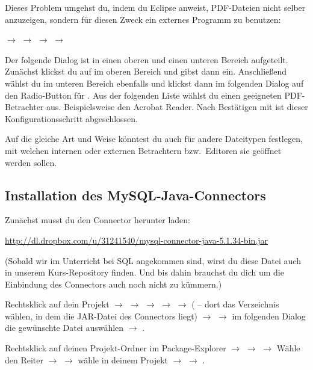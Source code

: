 Dieses Problem umgehst du, indem du Eclipse anweist, PDF-Dateien nicht selber
anzuzeigen, sondern für diesen Zweck ein externes Programm zu benutzen:

 $\rightarrow$  $\rightarrow$ 
$\rightarrow$  $\rightarrow$ 

Der folgende Dialog ist in einen oberen und einen unteren Bereich aufgeteilt.
Zunächst klickst du auf  im oberen Bereich und gibst dann
 ein. Anschließend wählst du im unteren Bereich ebenfalls
 und klickst dann im folgenden Dialog auf den Radio-Button für
. Aus der folgenden Liste wählst du einen geeigneten
PDF-Betrachter aus. Beispielsweise den Acrobat Reader. Nach Bestätigen mit
 ist dieser Konfigurationsschritt abgeschlossen.

Auf die gleiche Art und Weise könntest du auch für andere Dateitypen festlegen,
mit welchen internen oder externen Betrachtern bzw.\ Editoren sie geöffnet
werden sollen.


\subsection{Installation des
MySQL-Java-Connectors}\label{mysql-connector-installation}

Zunächst musst du den Connector herunter laden:

\url{http://dl.dropbox.com/u/31241540/mysql-connector-java-5.1.34-bin.jar}

(Sobald wir im Unterricht bei SQL angekommen sind, wirst du diese Datei auch in
unserem Kurs-Repository finden. Und bis dahin brauchst du dich um die
Einbindung des Connectors auch noch nicht zu kümmern.)

Rechtsklick auf dein Projekt $\rightarrow$  $\rightarrow$
 $\rightarrow$  $\rightarrow$ 
$\rightarrow$  ( -- dort das Verzeichnis
wählen, in dem die JAR-Datei des Connectors liegt) $\rightarrow$ 
$\rightarrow$ im folgenden Dialog die gewünschte Datei auswählen $\rightarrow$
.

Rechtsklick auf deinen Projekt-Ordner im Package-Explorer $\rightarrow$
 $\rightarrow$ 
$\rightarrow$ Wähle den Reiter  $\rightarrow$  $\rightarrow$ wähle  in
deinem Projekt $\rightarrow$  $\rightarrow$ .


